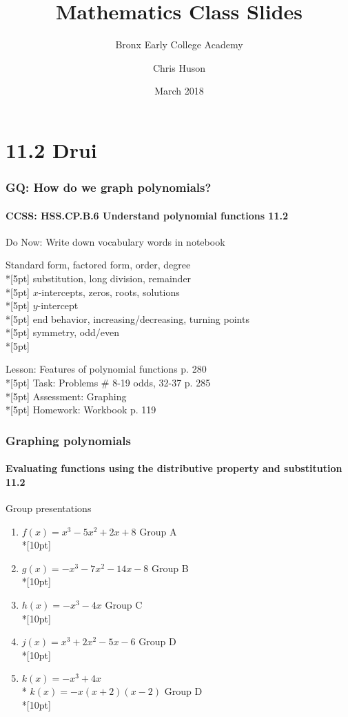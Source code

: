 \documentclass{beamer}
\title{Mathematics Class Slides}
\subtitle{Bronx Early College Academy}
\author{Chris Huson}
\date{March 2018}
\begin{document}
\frame{\titlepage}


\section{11.2 Drui}
\frame
{
  \frametitle{GQ: How do we graph polynomials?}
  \framesubtitle{CCSS: HSS.CP.B.6 Understand polynomial functions \qquad \qquad \qquad \alert{11.2}}

  \begin{block}{Do Now: Write down vocabulary words in notebook}
  \begin{enumerate}
    Standard form, factored form, order, degree\\*[5pt]
    substitution, long division, remainder\\*[5pt]
    $x$-intercepts, zeros, roots, solutions\\*[5pt]
    $y$-intercept\\*[5pt]
    end behavior, increasing/decreasing, turning points\\*[5pt]
    symmetry, odd/even\\*[5pt]
  \end{enumerate}
  \end{block}
  Lesson: Features of polynomial functions p. 280\\*[5pt]
  Task: Problems \# 8-19 odds, 32-37 p. 285\\*[5pt]
  Assessment: Graphing\\*[5pt]
  Homework: Workbook p. 119 
}

\frame
{
  \frametitle{Graphing polynomials}
  \framesubtitle{Evaluating functions using the distributive property and substitution \qquad \qquad \qquad \alert{11.2}}

  \begin{block}{Group presentations}
  \begin{enumerate}
      \item $f(x)=x^3-5x^2+2x+8$ \qquad Group A\\*[10pt]
      \item $g(x)=-x^3-7x^2-14x-8$ \qquad Group B\\*[10pt]
      \item $h(x)=-x^3-4x$ \qquad \qquad \qquad Group C\\*[10pt]
      \item $j(x)=x^3+2x^2-5x-6$ \qquad Group D\\*[10pt]
      \item $k(x)=-x^3+4x$\\*
      $k(x)=-x(x+2)(x-2)$ \qquad Group D\\*[10pt]

  \end{enumerate}
  \end{block}
}
\end{document}
